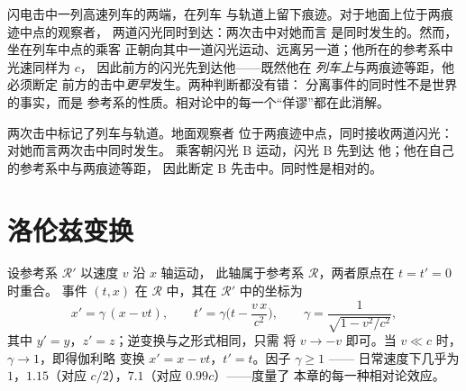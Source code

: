 \begin{example}[列车与两次闪电]\label{ex:b3:relativistic-kinematics:train}
闪电击中一列高速列车的两端，在列车
与轨道上留下痕迹。对于地面上位于两痕迹中点的观察者，
两道闪光同时到达：两次击中对她而言
是同时发生的。然而，坐在列车中点的乘客
正朝向其中一道闪光运动、远离另一道；他所在的参考系中光速同样为 $c$，
因此前方的闪光先到达他——既然他在
\emph{列车上}与两痕迹等距，他必须断定
前方的击中\emph{更早}发生。两种判断都没有错：
分离事件的同时性不是世界的事实，而是
参考系的性质。相对论中的每一个“佯谬”都在此消解。
\end{example}

\begin{omfigure}

{\small 两次击中标记了列车与轨道。地面观察者
位于两痕迹中点，同时接收两道闪光：对她而言两次击中同时发生。
乘客朝闪光 B 运动，闪光 B 先到达
他；他在自己的参考系中与两痕迹等距，
因此断定 B 先击中。同时性是相对的。}
\end{omfigure}

\section{洛伦兹变换}

\begin{theorem}[洛伦兹变换]\label{thm:b3:relativistic-kinematics:lorentz}
设参考系 $\mathcal R'$ 以速度 $v$ 沿 $x$ 轴运动，
此轴属于参考系 $\mathcal R$，两者原点在 $t = t' = 0$ 时重合。
事件 $(t, x)$ 在 $\mathcal R$ 中，其在 $\mathcal R'$ 中的坐标为
\[
x' = \gamma\,(x - vt) , \qquad
t' = \gamma\Big(t - \frac{v\,x}{c^2}\Big) , \qquad
\gamma = \frac{1}{\sqrt{1 - v^2/c^2}} ,
\]
其中 $y' = y$，$z' = z$；逆变换与之形式相同，只需
将 $v \to -v$ 即可。当 $v \ll c$ 时，$\gamma \to 1$，即得伽利略
变换 $x' = x - vt$，$t' = t$。因子 $\gamma \ge 1$ ——
日常速度下几乎为 $1$，$1.15$（对应 $c/2$），$7.1$（对应 $0.99c$）——度量了
本章的每一种相对论效应。
\end{theorem}

